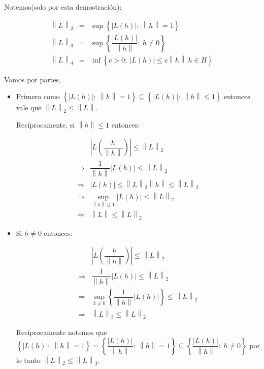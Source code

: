 \documentclass[11pt]{article}
\newcommand{\norm}[1]{\left\lVert#1\right\rVert}
\newcommand{\abs}[1]{\left\lvert#1\right\rvert}
\newcommand{\sett}[1]{\left\lbrace#1\right\rbrace}
\numberwithin{theorem}{subsection}
\newenvironment{proof}[1][Demostraci\'on]{\begin{trivlist}
		\item[\hskip \labelsep {\bfseries #1}]}{\end{trivlist}}
\begin{document}
\begin{proof}
	Notemos(solo por esta demostraci\'on):
	
	\[
	\begin{array}{ccc}
	 \norm{L}_2 & = & \sup \sett{\abs{L(h)}: \ \norm{h} = 1} \\
	 \norm{L}_3 & = & \sup \sett{\dfrac{\abs{L(h)}}{\norm{h}}: \ h \neq 0} \\
	 \norm{L}_4 & =  & \inf \sett{c > 0: \ \abs{L(h)} \leq c \norm{h} \ h \in H}
	\end{array}
	\]
	
	Vamos por partes, 
	
	\begin{itemize}
		\item Primero como $\sett{\abs{L(h)}: \ \norm{h} = 1} \subseteq \sett{\abs{L(h)}: \ \norm{h} \leq 1}$ entonces vale que $\norm{L}_2 \leq \norm{L}$. 
		
		Rec\'iprocamente, si $\norm{h} \leq 1$ entonces:
		
		\begin{equation*}
		\begin{array}{cc}
		& \abs{L\left(\dfrac{h}{\norm{h}}\right)} \leq \norm{L}_2 \\
		\Longrightarrow &	\dfrac{1}{\norm{h}}\abs{L(h)} \leq \norm{L}_2 \\
		\Longrightarrow &	\abs{L(h)} \leq \norm{L}_2 \norm{h} \leq \norm{L}_2 \\
		\Longrightarrow &	\sup\limits_{\norm{h} \leq 1} \abs{L(h)} \leq \norm{L}_2 \\
		\Longrightarrow &	\norm{L} \leq \norm{L}_2
		\end{array}
		\end{equation*}
		
		\item Si $h \neq 0$ entonces:
		
		\begin{equation*}
		\begin{array}{cc}
		& \abs{L\left(\dfrac{h}{\norm{h}}\right)}  \leq \norm{L}_2 \\
		\Longrightarrow &	\dfrac{1}{\norm{h}}\abs{L(h)} \leq \norm{L}_2 \\
		\Longrightarrow &	\sup\limits_{h \neq 0} \sett{\dfrac{1}{\norm{h}}\abs{L(h)}} \leq \norm{L}_2 \\
		\Longrightarrow &	\norm{L}_3 \leq \norm{L}_2
		\end{array}
		\end{equation*}
		
		Rec\'iprocamente notemos que $\sett{\abs{L(h)}: \ \norm{h} = 1} = \sett{\dfrac{\abs{L(h)}}{\norm{h}}: \ \norm{h} = 1} \subseteq \sett{\dfrac{\abs{L(h)}}{\norm{h}}: \ h \neq 0}$ por lo tanto $\norm{L}_2 \leq \norm{L}_3$.
		

\end{itemize}
\end{proof}
\end{document}
